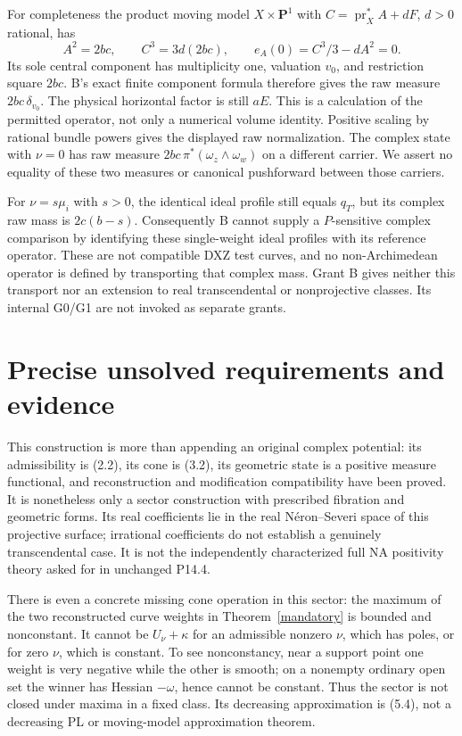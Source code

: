 \documentclass[11pt]{article}
\theoremstyle{remark}\newtheorem{remark}[theorem]{Remark}
\begin{document}
For completeness the product moving model $X\times\mathbf P^1$
with $C=\operatorname{pr}_X^*A+dF$, $d>0$ rational, has
\[
 A^2=2bc,\qquad C^3=3d(2bc),\qquad
 e_A(0)=C^3/3-dA^2=0.
 \tag{7.2}
\]
Its sole central component has multiplicity one, valuation $v_0$,
and restriction square $2bc$. B's exact finite component formula
therefore gives the raw measure $2bc\,\delta_{v_0}$.
The physical horizontal factor is still $aE$.
This is a calculation of the permitted operator, not only a
numerical volume identity. Positive scaling by rational bundle
powers gives the displayed raw normalization.
The complex state with $\nu=0$ has raw measure
$2bc\,\pi^*(\omega_z\wedge\omega_w)$ on a different carrier.
We assert no equality of these two measures or canonical
pushforward between those carriers.

For $\nu=s\mu_i$ with $s>0$, the identical ideal profile still
equals $q_T$, but its complex raw mass is $2c(b-s)$.
Consequently B cannot supply a $P$-sensitive complex comparison
by identifying these single-weight ideal profiles with its reference
operator. These are not compatible DXZ test curves, and no
non-Archimedean operator is defined by transporting that complex mass.
Grant B gives neither this transport nor an extension to real
transcendental or nonprojective classes. Its internal G0/G1 are
not invoked as separate grants.

\section{Precise unsolved requirements and evidence}
This construction is more than appending an original complex potential:
its admissibility is (2.2), its cone is (3.2), its geometric state is
a positive measure functional, and reconstruction and modification
compatibility have been proved. It is nonetheless only a sector
construction with prescribed fibration and geometric forms.
Its real coefficients lie in the real N\'eron--Severi space of
this projective surface; irrational coefficients do not establish
a genuinely transcendental case.
It is not the independently characterized full NA positivity theory
asked for in unchanged P14.4.

There is even a concrete missing cone operation in this sector:
the maximum of the two reconstructed curve weights in
Theorem~\ref{mandatory} is bounded and nonconstant.
It cannot be $U_\nu+\kappa$ for an admissible nonzero $\nu$,
which has poles, or for zero $\nu$, which is constant.
To see nonconstancy, near a support point one weight is very negative
while the other is smooth; on a nonempty ordinary open set the
winner has Hessian $-\omega$, hence cannot be constant.
Thus the sector is not closed under maxima in a fixed class.
Its decreasing approximation is (5.4), not a decreasing PL or
moving-model approximation theorem.
\end{document}
